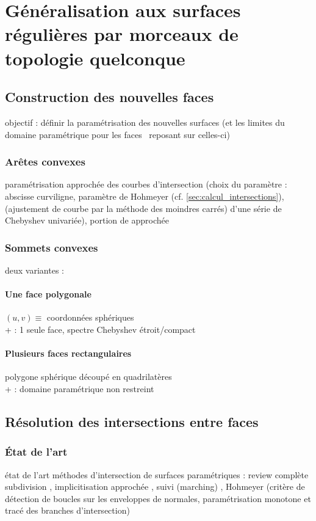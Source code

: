 \chapter[Généralisation aux surfaces de topologie quelconque]{Généralisation aux surfaces régulières par morceaux de topologie quelconque}
\label{chap:multi_patch}

\section{Construction des nouvelles faces}

objectif : définir la paramétrisation des nouvelles surfaces (et les limites du domaine paramétrique pour les faces \brep\ reposant sur celles-ci)

\subsection{Arêtes convexes}
paramétrisation approchée des courbes d'intersection (choix du paramètre : abscisse curviligne, paramètre de Hohmeyer (cf. \autoref{sec:calcul_intersections}),  (ajustement de courbe par la méthode des moindres carrés) d'une série de Chebyshev univariée), portion de  approchée 

\subsection{Sommets convexes}
deux variantes :

\subsubsection{Une face polygonale}
$(u,v) \equiv$ coordonnées sphériques\\
+ : 1 seule face, spectre Chebyshev étroit/compact


\subsubsection{Plusieurs faces rectangulaires}
polygone sphérique découpé en quadrilatères \cite{hahn1989}\\
+ : domaine paramétrique non restreint


\section{Résolution des intersections entre faces}
\subsection{État de l'art}
état de l'art méthodes d'intersection de surfaces paramétriques :
review complète \cite{patrikalakis2009}\\
subdivision \cite{houghton1985}, implicitisation approchée \cite{dokken2001}, suivi (marching) \cite{barnhill1990}, Hohmeyer \cite{hohmeyer1992} (critère de détection de boucles sur les enveloppes de normales, paramétrisation monotone et tracé des branches d'intersection)


